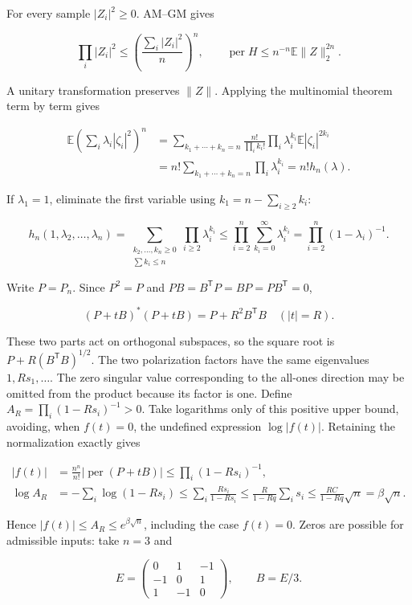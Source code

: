 \documentclass[11pt,a4paper]{article}
\begin{document}
For every sample \(|Z_i|^2\ge0\). AM--GM gives

\[
\prod_i|Z_i|^2\le\left(\frac{\sum_i|Z_i|^2}{n}\right)^n,
\qquad \operatorname{per}H\le n^{-n}\mathbb E\|Z\|_2^{2n}.
\]

A unitary transformation preserves \(\|Z\|\). Applying the multinomial theorem term by term gives

\[
\begin{aligned}
\mathbb E\left(\sum_i\lambda_i|\zeta_i|^2\right)^n
&=\sum_{k_1+\cdots+k_n=n}\frac{n!}{\prod_i k_i!}
\prod_i\lambda_i^{k_i}\mathbb E|\zeta_i|^{2k_i}\\
&=n!\sum_{k_1+\cdots+k_n=n}\prod_i\lambda_i^{k_i}
=n!h_n(\lambda).
\end{aligned}
\]

If \(\lambda_1=1\), eliminate the first variable using \(k_1=n-\sum_{i\ge2}k_i\):

\[
h_n(1,\lambda_2,\ldots,\lambda_n)
=\sum_{\substack{k_2,\ldots,k_n\ge0\\\sum k_i\le n}}\prod_{i\ge2}\lambda_i^{k_i}
\le\prod_{i=2}^n\sum_{k_i=0}^{\infty}\lambda_i^{k_i}
=\prod_{i=2}^n(1-\lambda_i)^{-1}.
\]

Write \(P=P_n\). Since \(P^2=P\) and \(PB=B^{\mathsf T}P=BP=PB^{\mathsf T}=0\),

\[
(P+tB)^*(P+tB)=P+R^2B^{\mathsf T}B
\quad(|t|=R).
\]

These two parts act on orthogonal subspaces, so the square root is \(P+R(B^{\mathsf T}B)^{1/2}\). The two polarization factors have the same eigenvalues \(1,Rs_1,\ldots\). The zero singular value corresponding to the all-ones direction may be omitted from the product because its factor is one. Define \(A_R=\prod_i(1-Rs_i)^{-1}>0\). Take logarithms only of this positive upper bound, avoiding, when \(f(t)=0\), the undefined expression \(\log|f(t)|\). Retaining the normalization exactly gives

\[
\begin{aligned}
|f(t)|&=\frac{n^n}{n!}|\operatorname{per}(P+tB)|
\le\prod_i(1-Rs_i)^{-1},\\
\log A_R&=-\sum_i\log(1-Rs_i)\le\sum_i\frac{Rs_i}{1-Rs_i}
\le\frac R{1-Rq}\sum_i s_i
\le\frac{RC}{1-Rq}\sqrt n=\beta\sqrt n.
\end{aligned}
\]

Hence \(|f(t)|\le A_R\le e^{\beta\sqrt n}\), including the case \(f(t)=0\). Zeros are possible for admissible inputs: take \(n=3\) and

\[
E=\begin{pmatrix}0&1&-1\\-1&0&1\\1&-1&0\end{pmatrix},\qquad B=E/3.
\]
\end{document}
